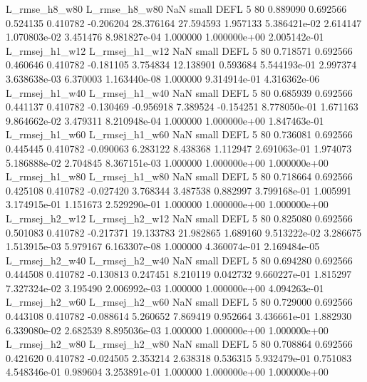  L_rmse_h8_w80  L_rmse_h8_w80                   NaN      small     DEFL                 5 80 0.889090       0.692566 0.524135       0.410782   -0.206204     28.376164     27.594593     1.957133   5.386421e-02  2.614147 1.070803e-02     3.451476   8.981827e-04            1.000000    1.000000e+00        2.005142e-01
L_rmsej_h1_w12 L_rmsej_h1_w12                   NaN      small     DEFL                 5 80 0.718571       0.692566 0.460646       0.410782   -0.181105      3.754834     12.138901     0.593684   5.544193e-01  2.997374 3.638638e-03     6.370003   1.163440e-08            1.000000    9.314914e-01        4.316362e-06
L_rmsej_h1_w40 L_rmsej_h1_w40                   NaN      small     DEFL                 5 80 0.685939       0.692566 0.441137       0.410782   -0.130469     -0.956918      7.389524    -0.154251   8.778050e-01  1.671163 9.864662e-02     3.479311   8.210948e-04            1.000000    1.000000e+00        1.847463e-01
L_rmsej_h1_w60 L_rmsej_h1_w60                   NaN      small     DEFL                 5 80 0.736081       0.692566 0.445445       0.410782   -0.090063      6.283122      8.438368     1.112947   2.691063e-01  1.974073 5.186888e-02     2.704845   8.367151e-03            1.000000    1.000000e+00        1.000000e+00
L_rmsej_h1_w80 L_rmsej_h1_w80                   NaN      small     DEFL                 5 80 0.718664       0.692566 0.425108       0.410782   -0.027420      3.768344      3.487538     0.882997   3.799168e-01  1.005991 3.174915e-01     1.151673   2.529290e-01            1.000000    1.000000e+00        1.000000e+00
L_rmsej_h2_w12 L_rmsej_h2_w12                   NaN      small     DEFL                 5 80 0.825080       0.692566 0.501083       0.410782   -0.217371     19.133783     21.982865     1.689160   9.513222e-02  3.286675 1.513915e-03     5.979167   6.163307e-08            1.000000    4.360074e-01        2.169484e-05
L_rmsej_h2_w40 L_rmsej_h2_w40                   NaN      small     DEFL                 5 80 0.694280       0.692566 0.444508       0.410782   -0.130813      0.247451      8.210119     0.042732   9.660227e-01  1.815297 7.327324e-02     3.195490   2.006992e-03            1.000000    1.000000e+00        4.094263e-01
L_rmsej_h2_w60 L_rmsej_h2_w60                   NaN      small     DEFL                 5 80 0.729000       0.692566 0.443108       0.410782   -0.088614      5.260652      7.869419     0.952664   3.436661e-01  1.882930 6.339080e-02     2.682539   8.895036e-03            1.000000    1.000000e+00        1.000000e+00
L_rmsej_h2_w80 L_rmsej_h2_w80                   NaN      small     DEFL                 5 80 0.708864       0.692566 0.421620       0.410782   -0.024505      2.353214      2.638318     0.536315   5.932479e-01  0.751083 4.548346e-01     0.989604   3.253891e-01            1.000000    1.000000e+00        1.000000e+00
